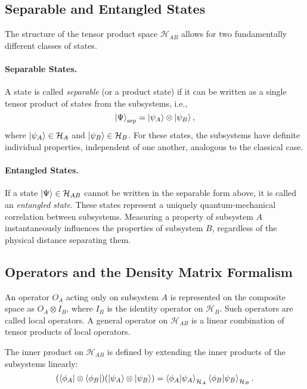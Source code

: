 \subsection{Separable and Entangled States}
\label{sub:separable_entangled}

The structure of the tensor product space $\mathcal{H}_{AB}$ allows for two
fundamentally different classes of states.

\paragraph{Separable States.}
A state is called \emph{separable} (or a product state) if it
can be written as a single tensor product of states from the subsystems,
i.e.,
\begin{equation}
	\ket{\Psi}_{\text{sep}} = \ket{\psi_A} \otimes \ket{\psi_B},
\end{equation}
where $\ket{\psi_A} \in \mathcal{H}_A$ and $\ket{\psi_B} \in \mathcal{H}_B$.
For these states, the subsystems have definite individual properties,
independent of one another, analogous to the classical case.

\paragraph{Entangled States.}
If a state $\ket{\Psi} \in \mathcal{H}_{AB}$ cannot be written in the
separable form above, it is called an \emph{entangled state}. These states
represent a uniquely quantum-mechanical correlation between subsystems.
Measuring a property of subsystem $A$ instantaneously influences the
properties of subsystem $B$, regardless of the physical distance
separating them.

\subsection{Operators and the Density Matrix Formalism}
\label{sub:operators_density}

An operator $O_A$ acting only on subsystem $A$ is represented on the
composite space as $O_A \otimes I_B$, where $I_B$ is the
identity operator on $\mathcal{H}_B$. Such operators are called
local operators. A general operator on $\mathcal{H}_{AB}$ is a
linear combination of tensor products of local operators.

The inner product on $\mathcal{H}_{AB}$ is defined by extending the inner
products of the subsystems linearly:
\begin{equation}
	(\bra{\phi_A} \otimes \bra{\phi_B}) (\ket{\psi_A} \otimes \ket{\psi_B})
	= \braket{\phi_A | \psi_A}_{\mathcal{H}_A} \braket{\phi_B | \psi_B}_{\mathcal{H}_B}.
\end{equation}

